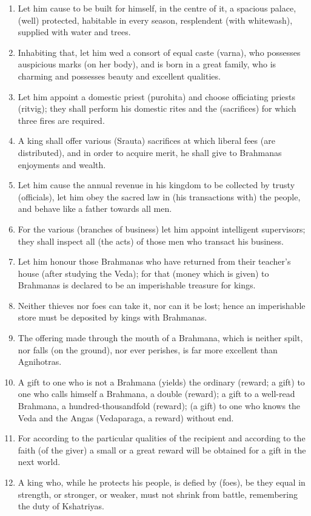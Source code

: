 \begin{enumerate}
\item Let him cause to be built for himself, in the centre of it, a spacious palace, (well) protected, habitable in every season, resplendent (with whitewash), supplied with water and trees.
\item Inhabiting that, let him wed a consort of equal caste (varna), who possesses auspicious marks (on her body), and is born in a great family, who is charming and possesses beauty and excellent qualities.
\item Let him appoint a domestic priest (purohita) and choose officiating priests (ritvig); they shall perform his domestic rites and the (sacrifices) for which three fires are required.
\item A king shall offer various (Srauta) sacrifices at which liberal fees (are distributed), and in order to acquire merit, he shall give to Brahmanas enjoyments and wealth.
\item Let him cause the annual revenue in his kingdom to be collected by trusty (officials), let him obey the sacred law in (his transactions with) the people, and behave like a father towards all men.
\item For the various (branches of business) let him appoint intelligent supervisors; they shall inspect all (the acts) of those men who transact his business.
\item Let him honour those Brahmanas who have returned from their teacher's house (after studying the Veda); for that (money which is given) to Brahmanas is declared to be an imperishable treasure for kings.
\item Neither thieves nor foes can take it, nor can it be lost; hence an imperishable store must be deposited by kings with Brahmanas.
\item The offering made through the mouth of a Brahmana, which is neither spilt, nor falls (on the ground), nor ever perishes, is far more excellent than Agnihotras.
\item A gift to one who is not a Brahmana (yields) the ordinary (reward; a gift) to one who calls himself a Brahmana, a double (reward); a gift to a well-read Brahmana, a hundred-thousandfold (reward); (a gift) to one who knows the Veda and the Angas (Vedaparaga, a reward) without end.
\item For according to the particular qualities of the recipient and according to the faith (of the giver) a small or a great reward will be obtained for a gift in the next world.
\item A king who, while he protects his people, is defied by (foes), be they equal in strength, or stronger, or weaker, must not shrink from battle, remembering the duty of Kshatriyas.

\end{enumerate}
